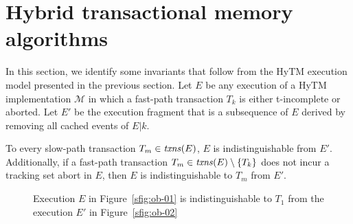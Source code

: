 \section{Hybrid transactional memory algorithms}\label{sec:hytmalgos}
%
In this section, we identify some invariants that follow from the HyTM execution model presented in the previous section.
Let $E$ be any execution of a HyTM implementation $\mathcal{M}$ in
which a fast-path transaction $T_k$ is either
t-incomplete or aborted. Let $E'$ be the execution fragment that is a subsequence of $E$ derived by removing all cached events of $E|k$.
%
\begin{observation} 
\label{ob:one}
To every slow-path transaction $T_m \in \ms{txns}(E)$, $E$ is indistinguishable from $E'$. Additionally, if a fast-path transaction $T_m\in \ms{txns}(E) \setminus \{T_k\}$ does not incur a tracking set abort in $E$, 
then $E$ is indistinguishable to $T_m$ from $E'$.
\end{observation}
%
\begin{figure*}[t]
\begin{center}
	\subfloat[\label{sfig:ob-01}]{\scalebox{0.5}[0.5]{}}
	\hspace{10mm}
	\subfloat[\label{sfig:ob-02}]{\scalebox{0.5}[0.5]{}}
	 
\end{center}
\caption{
\label{fig:ob1}
Execution $E$ in Figure~\ref{sfig:ob-01} is indistinguishable
to $T_1$ from the execution $E'$ in Figure~\ref{sfig:ob-02}}
\end{figure*}
%
%

%
%